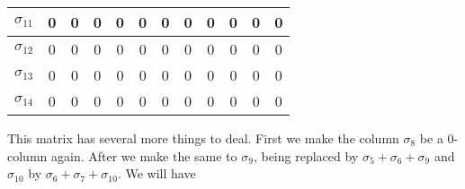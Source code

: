 \begin{enumerate}
\begin{center}
\begin{tabular}{|c|c|c|c|c|c|c|c|c|c|c|c|}
            $\sigma_{11}$ & 0                  & 0          & 0          & 0          & 0          & 0          & 0             & 0             & 0             & 0             & 0             \\ \hline
            $\sigma_{12}$ & 0                  & 0          & 0          & 0          & 0          & 0          & 0             & 0             & 0             & 0             & 0             \\ \hline
            $\sigma_{13}$ & 0                  & 0          & 0          & 0          & 0          & 0          & 0             & 0             & 0             & 0             & 0             \\ \hline
            $\sigma_{14}$ & 0                  & 0          & 0          & 0          & 0          & 0          & 0             & 0             & 0             & 0             & 0             \\ \hline
        \end{tabular}
    \end{center}

    This matrix has several more things to deal. First we make the column
    $\sigma_8$ be a 0-column again. After we make the same to $\sigma_9$,
    being replaced by $\sigma_5 + \sigma_6 + \sigma_9$ and $\sigma_{10}$ by
    $\sigma_6 + \sigma_7 + \sigma_{10}$. We will have  


\end{enumerate}
